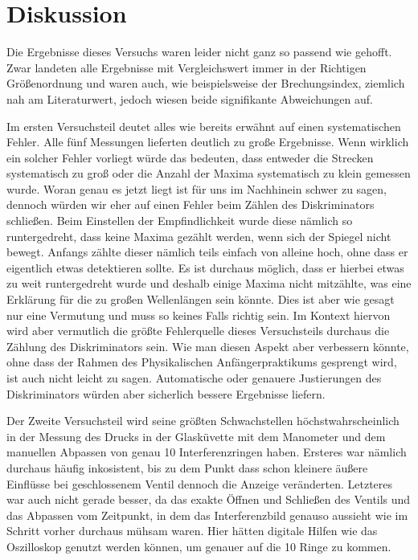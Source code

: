 \documentclass{article}
\begin{document}
\newpage
\section{Diskussion}

Die Ergebnisse dieses Versuchs waren leider nicht ganz so passend wie gehofft. Zwar landeten alle Ergebnisse mit Vergleichswert immer in der Richtigen Größenordnung und waren auch, wie beispielsweise der Brechungsindex, ziemlich nah am Literaturwert, jedoch wiesen beide signifikante Abweichungen auf.

Im ersten Versuchsteil deutet alles wie bereits erwähnt auf einen systematischen Fehler. Alle fünf Messungen lieferten deutlich zu große Ergebnisse. Wenn wirklich ein solcher Fehler vorliegt würde das bedeuten, dass entweder die Strecken systematisch zu groß oder die Anzahl der Maxima systematisch zu klein gemessen wurde. Woran genau es jetzt liegt ist für uns im Nachhinein schwer zu sagen, dennoch würden wir eher auf einen Fehler beim Zählen des Diskriminators schließen. Beim Einstellen der Empfindlichkeit wurde diese nämlich so runtergedreht, dass keine Maxima gezählt werden, wenn sich der Spiegel nicht bewegt. Anfangs zählte dieser nämlich teils einfach von alleine hoch, ohne dass er eigentlich etwas detektieren sollte. Es ist durchaus möglich, dass er hierbei etwas zu weit runtergedreht wurde und deshalb einige Maxima nicht mitzählte, was eine Erklärung für die zu großen Wellenlängen sein könnte. Dies ist aber wie gesagt nur eine Vermutung und muss so keines Falls richtig sein. Im Kontext hiervon wird aber vermutlich die größte Fehlerquelle dieses Versuchsteils durchaus die Zählung des Diskriminators sein. Wie man diesen Aspekt aber verbessern könnte, ohne dass der Rahmen des Physikalischen Anfängerpraktikums gesprengt wird, ist auch nicht leicht zu sagen. Automatische oder genauere Justierungen des Diskriminators würden aber sicherlich bessere Ergebnisse liefern.

Der Zweite Versuchsteil wird seine größten Schwachstellen höchstwahrscheinlich in der Messung des Drucks in der Glasküvette mit dem Manometer und dem manuellen Abpassen von genau 10 Interferenzringen haben. Ersteres war nämlich durchaus häufig inkosistent, bis zu dem Punkt dass schon kleinere äußere Einflüsse bei geschlossenem Ventil dennoch die Anzeige veränderten. Letzteres war auch nicht gerade besser, da das exakte Öffnen und Schließen des Ventils und das Abpassen vom Zeitpunkt, in dem das Interferenzbild genauso aussieht wie im Schritt vorher durchaus mühsam waren. Hier hätten digitale Hilfen wie das Oszilloskop genutzt werden können, um genauer auf die 10 Ringe zu kommen. 
\end{document}

